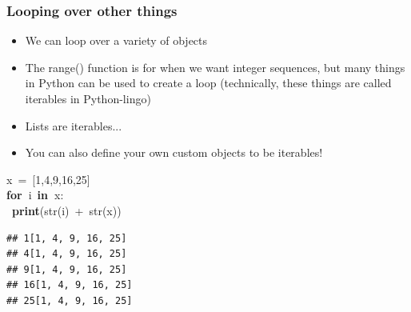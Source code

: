 \documentclass{beamer}\usepackage[]{graphicx}\usepackage[]{color}
\makeatletter
\newcommand{\hlnum}[1]{\textcolor[rgb]{0.686,0.059,0.569}{#1}}%
\newcommand{\hlopt}[1]{\textcolor[rgb]{0,0,0}{#1}}%
\newcommand{\hlstd}[1]{\textcolor[rgb]{0.345,0.345,0.345}{#1}}%
\newcommand{\hlkwa}[1]{\textcolor[rgb]{0.161,0.373,0.58}{\textbf{#1}}}%
\newcommand{\hlkwb}[1]{\textcolor[rgb]{0.69,0.353,0.396}{#1}}%
\newenvironment{kframe}{%
 \def\at@end@of@kframe{}%
 \ifinner\ifhmode%
  \def\at@end@of@kframe{\end{minipage}}%
  \begin{minipage}{\columnwidth}%
 \fi\fi%
 \def\FrameCommand##1{\hskip\@totalleftmargin \hskip-\fboxsep
 \colorbox{shadecolor}{##1}\hskip-\fboxsep
     \hskip-\linewidth \hskip-\@totalleftmargin \hskip\columnwidth}%
 \MakeFramed {\advance\hsize-\width
   \@totalleftmargin\z@ \linewidth\hsize
   \@setminipage}}%
 {\par\unskip\endMakeFramed%
 \at@end@of@kframe}
\newenvironment{knitrout}{}{} %
\makeatother
\begin{document}
\begin{frame}[fragile]
\frametitle{Looping over other things}
\begin{itemize}
	\item We can loop over a variety of objects

	\item The range() function is for when we want integer sequences, but many things in Python can be used to create a loop (technically, these things are called iterables in Python-lingo)

	\item Lists are iterables...

	\item You can also define your own custom objects to be iterables!

\end{itemize}
\begin{knitrout}
\color{fgcolor}\begin{kframe}
\noindent
\ttfamily
\hlstd{x\ }\hlopt{=\ {[}}\hlstd{}\hlnum{1}\hlstd{}\hlopt{,}\hlstd{}\hlnum{4}\hlstd{}\hlopt{,}\hlstd{}\hlnum{9}\hlstd{}\hlopt{,}\hlstd{}\hlnum{16}\hlstd{}\hlopt{,}\hlstd{}\hlnum{25}\hlstd{}\hlopt{{]}}\hspace*{\fill}\\
\hlstd{}\hlkwa{for\ }\hlstd{i\ }\hlkwa{in\ }\hlstd{x}\hlopt{:}\hspace*{\fill}\\
\hlstd{\ }\hlkwa{print}\hlstd{}\hlopt{(}\hlstd{}\hlkwb{str}\hlstd{}\hlopt{(}\hlstd{i}\hlopt{)\ +\ }\hlstd{}\hlkwb{str}\hlstd{}\hlopt{(}\hlstd{x}\hlopt{))}\hlstd{}\hspace*{\fill}
\mbox{}
\normalfont

\begin{verbatim}
## 1[1, 4, 9, 16, 25]
## 4[1, 4, 9, 16, 25]
## 9[1, 4, 9, 16, 25]
## 16[1, 4, 9, 16, 25]
## 25[1, 4, 9, 16, 25]
\end{verbatim}
\end{kframe}
\end{knitrout}

\end{frame}
\end{document}
